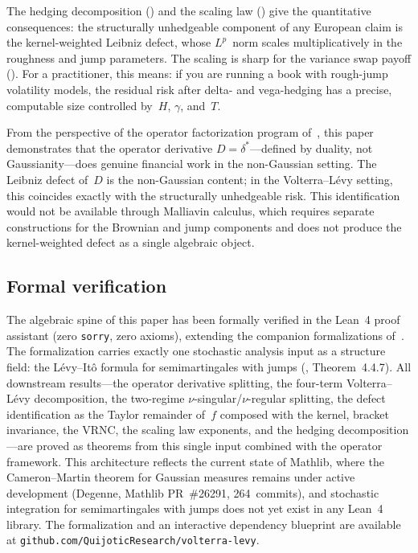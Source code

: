 \documentclass[11pt,a4paper]{article}
\theoremstyle{plain}
\theoremstyle{definition}
\theoremstyle{remark}
\begin{document}
The hedging decomposition () and
the scaling law () give the quantitative
consequences: the structurally unhedgeable component of any
European claim is the kernel-weighted Leibniz defect, whose
$L^p$~norm scales multiplicatively in the roughness and jump
parameters.  The scaling is sharp for the variance swap payoff
().  For a practitioner, this means:
if you are running a book with rough-jump volatility models,
the residual risk after delta- and vega-hedging has a precise,
computable size controlled by~$H$, $\gamma$, and~$T$.

From the perspective of the operator factorization program
of~\cite{Fontes2026a,Fontes2026d},
this paper demonstrates that the operator derivative
$D = \delta^*$---defined by duality, not Gaussianity---does
genuine financial work in the non-Gaussian setting.  The
Leibniz defect of~$D$ is the non-Gaussian content; in the
Volterra--L\'evy setting, this coincides exactly with the
structurally unhedgeable risk.  This identification would
not be available through Malliavin calculus, which requires
separate constructions for the Brownian and jump components
and does not produce the kernel-weighted defect as a single
algebraic object.


\subsection{Formal verification}

The algebraic spine of this paper has been formally verified
in the Lean~4 proof assistant (zero \texttt{sorry}, zero axioms),
extending the companion formalizations
of~\cite{Fontes2026a,Fontes2026d}.  The formalization carries
exactly one stochastic analysis input as a structure field:
the L\'evy--It\^o formula for semimartingales with jumps
(\cite{Applebaum2009}, Theorem~4.4.7).  All downstream
results---the operator derivative splitting, the four-term
Volterra--L\'evy decomposition, the two-regime
$\nu$-singular/$\nu$-regular splitting, the defect
identification as the Taylor remainder of~$f$ composed with
the kernel, bracket invariance, the VRNC, the scaling law
exponents, and the hedging decomposition---are proved as
theorems from this single input combined with the operator
framework.  This architecture reflects the current state of
Mathlib, where the Cameron--Martin theorem for Gaussian measures
remains under active development (Degenne, Mathlib
PR~\#26291, 264~commits), and stochastic integration for
semimartingales with jumps does not yet exist in any Lean~4
library.  The formalization and an interactive dependency
blueprint are available at
\texttt{github.com/QuijoticResearch/volterra-levy}.
\end{document}
